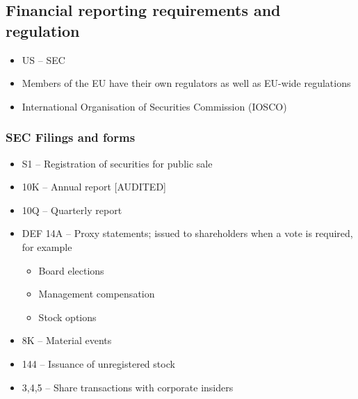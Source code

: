 \documentclass[../notes_compiled.tex]{subfiles}
\begin{document}
\subsection{Financial reporting requirements and regulation}
\begin{itemize}
\item US -- SEC
\item Members of the EU have their own regulators as well as EU-wide regulations
\item International Organisation of Securities Commission (IOSCO)
\end{itemize}

\subsubsection{SEC Filings and forms}
\begin{itemize}
\item S1 -- Registration of securities for public sale
\item 10K -- Annual report [AUDITED]
\item 10Q -- Quarterly report
\item DEF 14A -- Proxy statements; issued to shareholders when a vote is required, for example
\begin{itemize}
\item Board elections
\item Management compensation
\item Stock options
\end{itemize}
\item 8K -- Material events
\item 144 -- Issuance of unregistered stock
\item 3,4,5 -- Share transactions with corporate insiders
\end{itemize}
\end{document}
